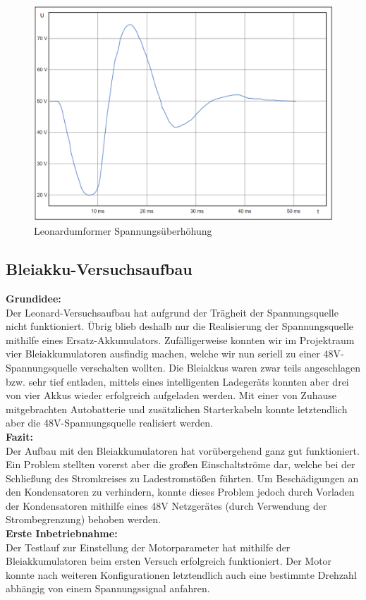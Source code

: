 \begin{figure}[H]
	\begin{center}
		\includegraphics[width=\textwidth]{figures/antrieb/Leonard_Spannungsueberschwingung.png}
		\caption{Leonardumformer Spannungsüberhöhung}
	\end{center}
\end{figure}


\newpage

\subsection{Bleiakku-Versuchsaufbau}

\textbf{Grundidee:}
\\[2mm]
Der Leonard-Versuchsaufbau hat aufgrund der Trägheit der Spannungsquelle nicht funktioniert. Übrig blieb deshalb nur die Realisierung der Spannungsquelle mithilfe eines Ersatz-Akkumulators. Zufälligerweise konnten wir im Projektraum vier Bleiakkumulatoren ausfindig machen, welche wir nun seriell zu einer 48V-Spannungsquelle verschalten wollten. Die Bleiakkus waren zwar teils angeschlagen bzw. sehr tief entladen, mittels eines intelligenten Ladegeräts konnten aber drei von vier Akkus wieder erfolgreich aufgeladen werden. Mit einer von Zuhause mitgebrachten Autobatterie und zusätzlichen Starterkabeln konnte letztendlich aber die 48V-Spannungsquelle realisiert werden.
\\[5mm]

\textbf{Fazit:}
\\[2mm]
Der Aufbau mit den Bleiakkumulatoren hat vorübergehend ganz gut funktioniert. Ein Problem stellten vorerst aber die großen Einschaltströme dar, welche bei der Schließung des Stromkreises zu Ladestromstößen führten. Um Beschädigungen an den Kondensatoren zu verhindern, konnte dieses Problem jedoch durch Vorladen der Kondensatoren mithilfe eines 48V Netzgerätes (durch Verwendung der Strombegrenzung) behoben werden.
\\[5mm]

\textbf{Erste Inbetriebnahme:}
\\[2mm]
Der Testlauf zur Einstellung der Motorparameter hat mithilfe der Bleiakkumulatoren beim ersten Versuch erfolgreich funktioniert. Der Motor konnte nach weiteren Konfigurationen letztendlich auch eine bestimmte Drehzahl abhängig von einem Spannungssignal anfahren. 

\newpage